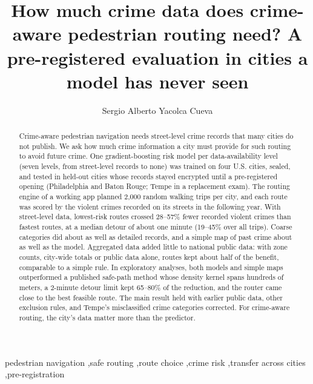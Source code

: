 \documentclass[preprint,12pt,authoryear]{elsarticle}
\begin{document}
\begin{frontmatter}

\title{How much crime data does crime-aware pedestrian routing need? A pre-registered evaluation in cities a model has never seen}

\author{Sergio Alberto Yacolca Cueva}

\begin{abstract}
Crime-aware pedestrian navigation needs street-level crime records that many cities do not publish. We ask how much crime information a city must provide for such routing to avoid future crime. One gradient-boosting risk model per data-availability level (seven levels, from street-level records to none) was trained on four U.S. cities, sealed, and tested in held-out cities whose records stayed encrypted until a pre-registered opening (Philadelphia and Baton Rouge; Tempe in a replacement exam). The routing engine of a working app planned 2,000 random walking trips per city, and each route was scored by the violent crimes recorded on its streets in the following year. With street-level data, lowest-risk routes crossed 28--57\% fewer recorded violent crimes than fastest routes, at a median detour of about one minute (19--45\% over all trips). Coarse categories did about as well as detailed records, and a simple map of past crime about as well as the model. Aggregated data added little to national public data: with zone counts, city-wide totals or public data alone, routes kept about half of the benefit, comparable to a simple rule. In exploratory analyses, both models and simple maps outperformed a published safe-path method whose density kernel spans hundreds of meters, a 2-minute detour limit kept 65--80\% of the reduction, and the router came close to the best feasible route. The main result held with earlier public data, other exclusion rules, and Tempe's misclassified crime categories corrected. For crime-aware routing, the city's data matter more than the predictor.
\end{abstract}

\begin{keyword}
pedestrian navigation \sep safe routing \sep route choice \sep crime risk \sep transfer across cities \sep pre-registration
\end{keyword}

\end{frontmatter}
\end{document}

